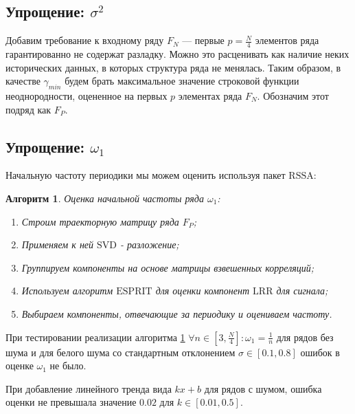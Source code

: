 \documentclass[specialist, substylefile = spbu.rtx,
			   subf, href, 12pt]{disser}
\newtheorem{algorithm}{Алгоритм}
\begin{document}
\subsection{Упрощение: $ \sigma^2 $}
Добавим требование к входному ряду $ F_N $ --- первые $ p = \frac{N}{4} $ элементов ряда гарантированно не содержат разладку. Можно это расценивать как наличие неких исторических данных, в которых структура ряда не менялась. Таким образом, в качестве $ \gamma_{min} $ будем брать максимальное значение строковой функции неоднородности, оцененное на первых $ p $ элементах ряда $ F_N $. Обозначим этот подряд как $ F_P $.

\subsection{Упрощение: $ \omega_1 $}
Начальную частоту периодики мы можем оценить используя пакет $ \mathrm{RSSA} $:
\begin{algorithm}\label{algo:estimate_omega_1}
	Оценка начальной частоты ряда $ \omega_1 $:
	\begin{enumerate}
		\item Строим траекторную матрицу ряда $ F_P $;
		\item Применяем к ней $ \mathrm{SVD} $ - разложение;
		\item Группируем компоненты на основе матрицы взвешенных корреляций;
		\item Используем алгоритм $ \mathrm{ESPRIT} $ для оценки компонент $ \mathrm{LRR} $ для сигнала;
		\item Выбираем компоненты, отвечающие за периодику и оцениваем частоту.	
	\end{enumerate}
\end{algorithm}

При тестировании реализации алгоритма \ref{algo:estimate_omega_1} $ \forall n \in [3, \frac{N}{4}]: \omega_1 = \frac{1}{n}$ для рядов без шума и для белого шума со стандартным отклонением $ \sigma \in [0.1, 0.8] $ ошибок в оценке $ \omega_1 $ не было. 

При добавление линейного тренда вида $ kx + b $ для рядов с шумом, ошибка оценки не превышала значение $ 0.02 $ для $ k \in [0.01, 0.5] $.
\end{document}
